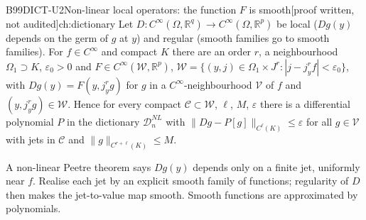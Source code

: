 \documentclass[11pt,a4paper,oneside]{report}
\newcommand{\badge}[2]{\textcolor{#1}{\textsf{\footnotesize[#2]}}}
\newcommand{\pw}{\badge{cD}{proof written, not audited}}
\newcommand{\R}{\mathbb{R}}\newcommand{\C}{\mathbb{C}}\newcommand{\N}{\mathbb{N}}\newcommand{\Z}{\mathbb{Z}}\newcommand{\Q}{\mathbb{Q}}
\newenvironment{dimcard}[5]{\par\Needspace{12\baselineskip}\begin{dimcardbox}{#1}{#2}{#3}{#4}{#5}}{\end{dimcardbox}}
\begin{document}
\begin{dimcard}{B99}{DICT-U2}{Non-linear local operators: the function $F$ is smooth}{\pw}{ch:dictionary}
Let $D:C^\infty(\Omega,\R^q)\to C^\infty(\Omega,\R^p)$ be local ($Dg(y)$ depends on the germ of $g$ at $y$) and regular (smooth families go to smooth families). For $f\in C^\infty$ and compact $K$ there are an order $r$, a neighbourhood $\Omega_1\supset K$, $\varepsilon_0>0$ and $F\in C^\infty(\mathcal W,\R^p)$, $\mathcal W=\{(y,j)\in\Omega_1\times J^r:|j-j^r_yf|<\varepsilon_0\}$, with $Dg(y)=F(y,j^r_yg)$ for $g$ in a $C^\infty$-neighbourhood $\mathcal V$ of $f$ and $(y,j^r_yg)\in\mathcal W$. Hence for every compact $\mathcal C\subset\mathcal W$, $\ell$, $M$, $\varepsilon$ there is a differential polynomial $P$ in the dictionary $\mathcal D^{NL}_n$ with $\|Dg-P[g]\|_{C^\ell(K)}\le\varepsilon$ for all $g\in\mathcal V$ with jets in $\mathcal C$ and $\|g\|_{C^{r+\ell}(K)}\le M$.
\end{dimcard}

\begin{proofidea}
A non-linear Peetre theorem says $Dg(y)$ depends only on a finite jet, uniformly near $f$. Realise each jet by an explicit smooth family of functions; regularity of $D$ then makes the jet-to-value map smooth. Smooth functions are approximated by polynomials.
\end{proofidea}
\end{document}
